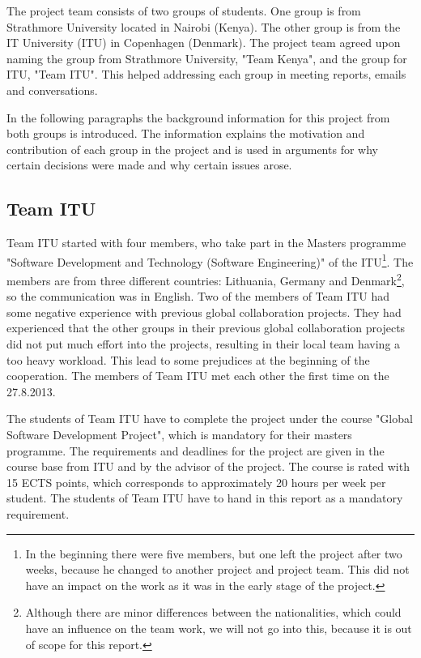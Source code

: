 The project team consists of two groups of students. One group is from Strathmore University located in Nairobi (Kenya). The other group is from the IT University (ITU) in Copenhagen (Denmark). The project team agreed upon naming the group from Strathmore University, "Team Kenya", and the group for ITU, "Team ITU". This helped addressing each group in meeting reports, emails and conversations.

In the following paragraphs the background information for this project from both groups is introduced. The information explains the motivation and contribution of each group in the project and is used in arguments for why certain decisions were made and why certain issues arose.


\subsection{Team ITU}
\label{sec:team_ITU}

Team ITU started with four members, who take part in the Masters programme "Software Development and Technology (Software Engineering)" of the ITU\footnote{In the beginning there were five members, but one left the project after two weeks, because he changed to another project and project team. This did not have an impact on the work as it was in the early stage of the project.}. The members are from three different countries: Lithuania, Germany and Denmark\footnote{Although there are minor differences between the nationalities, which could have an influence on the team work, we will not go into this, because it is out of scope for this report.}, so the communication was in English. Two of the members of Team ITU had some negative experience with previous global collaboration projects. They had experienced that the other groups in their previous global collaboration projects did not put much effort into the projects, resulting in their local team having a too heavy workload. This lead to some prejudices at the beginning of the cooperation. The members of Team ITU met each other the first time on the 27.8.2013.

The students of Team ITU have to complete the project under the course "Global Software Development Project", which is mandatory for their masters programme. The requirements and deadlines for the project are given in the course base from ITU and by the advisor of the project. The course is rated with 15 ECTS points, which corresponds to approximately 20 hours per week per student. The students of Team ITU have to hand in this report as a mandatory requirement.

